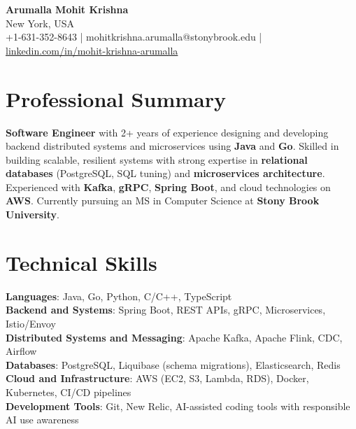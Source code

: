 \documentclass[letterpaper,11pt]{article}
\begin{document}
\begin{center}
  {\Large \textbf{Arumalla Mohit Krishna}} \\
  New York, USA \\
  +1-631-352-8643 \enspace | \enspace mohitkrishna.arumalla@stonybrook.edu \enspace | \enspace \href{https://www.linkedin.com/in/mohit-krishna-arumalla}{linkedin.com/in/mohit-krishna-arumalla}
\end{center}

\section{Professional Summary}
  \begin{itemize}[leftmargin=0.15in, label={}]
    \small{\item{
     \textbf{Software Engineer} with 2+ years of experience designing and developing backend distributed systems and microservices using \textbf{Java} and \textbf{Go}. Skilled in building scalable, resilient systems with strong expertise in \textbf{relational databases} (PostgreSQL, SQL tuning) and \textbf{microservices architecture}. Experienced with \textbf{Kafka}, \textbf{gRPC}, \textbf{Spring Boot}, and cloud technologies on \textbf{AWS}. Currently pursuing an MS in Computer Science at \textbf{Stony Brook University}.
    }}
  \end{itemize}
\vspace{-16pt}

\section{Technical Skills}
 \begin{itemize}[leftmargin=0.15in, label={}]
    \small{\item{
     \textbf{Languages}: Java, Go, Python, C/C++, TypeScript \\
     \textbf{Backend and Systems}: Spring Boot, REST APIs, gRPC, Microservices, Istio/Envoy \\
     \textbf{Distributed Systems and Messaging}: Apache Kafka, Apache Flink, CDC, Airflow \\
     \textbf{Databases}: PostgreSQL, Liquibase (schema migrations), Elasticsearch, Redis \\
     \textbf{Cloud and Infrastructure}: AWS (EC2, S3, Lambda, RDS), Docker, Kubernetes, CI/CD pipelines \\
     \textbf{Development Tools}: Git, New Relic, AI-assisted coding tools with responsible AI use awareness
    }}
 \end{itemize}
\vspace{-16pt}
\end{document}
